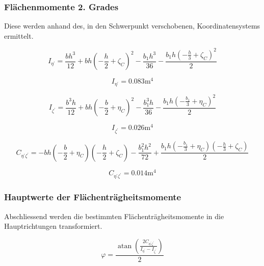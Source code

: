 \documentclass[
  12pt,
  letterpaper,
  DIV=11,
  egregdoesnotlikesansseriftitles]{scrartcl}
\begin{document}
\hypertarget{fluxe4chenmomente-2.-grades}{%
\subsubsection{Flächenmomente 2.
Grades}\label{fluxe4chenmomente-2.-grades}}

Diese werden anhand des, in den Schwerpunkt verschobenen,
Koordinatensystems ermittelt.

\begin{equation}I_{\eta^{'}} = \frac{b h^{3}}{12} + b h \left(- \frac{h}{2} + \zeta_{C}\right)^{2} - \frac{b_{1} h^{3}}{36} - \frac{b_{1} h \left(- \frac{h}{3} + \zeta_{C}\right)^{2}}{2}\end{equation}

\begin{equation}I_{\eta^{'}} = 0.083 \text{m}^{4}\end{equation}

\begin{equation}I_{\zeta^{'}} = \frac{b^{3} h}{12} + b h \left(- \frac{b}{2} + \eta_{C}\right)^{2} - \frac{b_{1}^{3} h}{36} - \frac{b_{1} h \left(- \frac{b_{1}}{3} + \eta_{C}\right)^{2}}{2}\end{equation}

\begin{equation}I_{\zeta^{'}} = 0.026 \text{m}^{4}\end{equation}

\begin{equation}C_{\eta^{'}\zeta^{'}} = - b h \left(- \frac{b}{2} + \eta_{C}\right) \left(- \frac{h}{2} + \zeta_{C}\right) - \frac{b_{1}^{2} h^{2}}{72} + \frac{b_{1} h \left(- \frac{b_{1}}{3} + \eta_{C}\right) \left(- \frac{h}{3} + \zeta_{C}\right)}{2}\end{equation}

\begin{equation}C_{\eta^{'}\zeta^{'}} = 0.014 \text{m}^{4}\end{equation}

\hypertarget{hauptwerte-der-fluxe4chentruxe4gheitsmomente}{%
\subsubsection{Hauptwerte der
Flächenträgheitsmomente}\label{hauptwerte-der-fluxe4chentruxe4gheitsmomente}}

Abschliessend werden die bestimmten Flächenträgheitsmomente in die
Hauptrichtungen transformiert.

\begin{equation}\varphi = \frac{\operatorname{atan}{\left(\frac{2 C_{\eta^{'}\zeta^{'}}}{I_{\eta^{'}} - I_{\zeta^{'}}} \right)}}{2}\end{equation}
\end{document}
